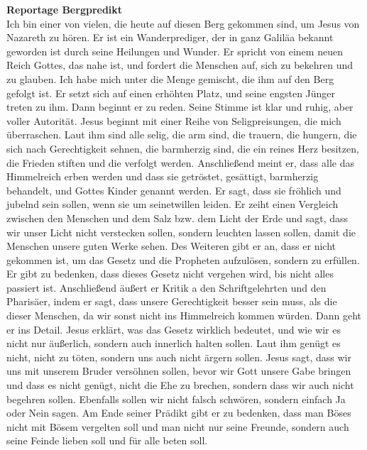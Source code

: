 \documentclass[12pt,a4paper,twocolumn]{report}
\begin{document}
	\noindent
	\Large
	\textbf{Reportage Bergpredikt}
	\\[0.2cm]
	\large
	\noindent
	Ich bin einer von vielen, die heute auf diesen Berg gekommen sind, um Jesus von Nazareth zu hören.
	Er ist ein Wanderprediger, der in ganz Galiläa bekannt geworden ist durch seine Heilungen und Wunder.
	Er spricht von einem neuen Reich Gottes, das nahe ist, und fordert die Menschen auf, sich zu bekehren und zu glauben.
	Ich habe mich unter die Menge gemischt, die ihm auf den Berg gefolgt ist.
	Er setzt sich auf einen erhöhten Platz, und seine  engsten Jünger treten zu ihm.
	Dann beginnt er zu reden.
	Seine Stimme ist klar und ruhig, aber voller Autorität.
	Jesus beginnt mit einer Reihe von Seligpreisungen, die mich überraschen.
	Laut ihm sind alle selig, die arm sind, die trauern, die hungern, die sich nach Gerechtigkeit sehnen, die barmherzig sind, die ein reines Herz besitzen, die Frieden stiften und die verfolgt werden.
	Anschließend meint er, dass alle das Himmelreich erben werden und dass sie getröstet, gesättigt, barmherzig behandelt, und Gottes Kinder genannt werden.
	Er sagt, dass sie fröhlich und jubelnd sein sollen, wenn sie um seinetwillen leiden.
	Er zeiht einen Vergleich zwischen den Menschen und dem Salz bzw. dem Licht der Erde und sagt, dass wir unser Licht nicht verstecken sollen, sondern leuchten lassen sollen, damit die Menschen unsere guten Werke sehen.
	Des Weiteren gibt er an, dass er nicht gekommen ist, um das Gesetz und die Propheten aufzulösen, sondern zu erfüllen.
	Er gibt zu bedenken, dass dieses Gesetz nicht vergehen wird, bis nicht alles passiert ist.
	Anschließend äußert er Kritik a den Schriftgelehrten und den Pharisäer, indem er sagt, dass unsere Gerechtigkeit besser sein muss, als die dieser Menschen, da wir sonst nicht ins Himmelreich kommen würden.
	Dann geht er ins Detail.
	Jesus erklärt, was das Gesetz wirklich bedeutet, und wie wir es nicht nur äußerlich, sondern auch innerlich halten sollen.
	Laut ihm genügt es nicht, nicht zu töten, sondern 
	uns auch nicht ärgern sollen.
	Jesus sagt, dass wir uns mit unserem Bruder versöhnen sollen, bevor wir Gott unsere Gabe bringen und dass es nicht genügt, nicht die Ehe zu brechen, sondern dass wir auch nicht begehren sollen.
	Ebenfalls sollen wir nicht falsch schwören, sondern einfach Ja oder Nein sagen.
	Am Ende seiner Prädikt gibt er zu bedenken, dass man Böses nicht mit Bösem vergelten soll und man nicht nur seine Freunde, sondern auch seine Feinde lieben soll und für alle beten soll.
\end{document}
